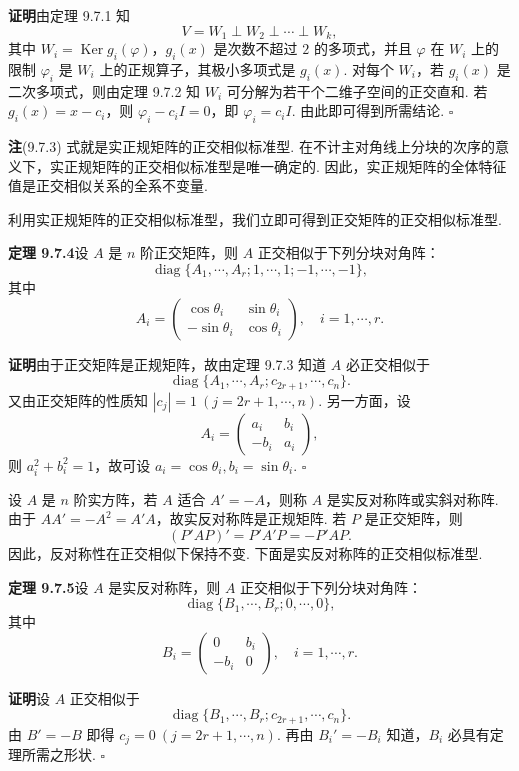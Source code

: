 \documentclass[UTF8,12pt,a4paper,fontset=fandol]{ctexart}
\begin{document}
\noindent\textbf{证明}\quad 由定理 9.7.1 知
\[
  V=W_1\perp W_2\perp\cdots\perp W_k,
\]
其中 $W_i=\operatorname{Ker}g_i(\varphi)$，$g_i(x)$ 是次数不超过 $2$ 的多项式，并且 $\varphi$ 在 $W_i$ 上的限制 $\varphi_i$ 是 $W_i$ 上的正规算子，其极小多项式是 $g_i(x)$. 对每个 $W_i$，若 $g_i(x)$ 是二次多项式，则由定理 9.7.2 知 $W_i$ 可分解为若干个二维子空间的正交直和. 若 $g_i(x)=x-c_i$，则 $\varphi_i-c_iI=0$，即 $\varphi_i=c_iI$. 由此即可得到所需结论. $\square$

\noindent\textbf{注}\quad (9.7.3) 式就是实正规矩阵的正交相似标准型. 在不计主对角线上分块的次序的意义下，实正规矩阵的正交相似标准型是唯一确定的. 因此，实正规矩阵的全体特征值是正交相似关系的全系不变量.

利用实正规矩阵的正交相似标准型，我们立即可得到正交矩阵的正交相似标准型.

\noindent\textbf{定理 9.7.4}\quad 设 $A$ 是 $n$ 阶正交矩阵，则 $A$ 正交相似于下列分块对角阵：
\[
  \operatorname{diag}\{A_1,\cdots,A_r;1,\cdots,1;-1,\cdots,-1\},
\]
其中
\[
  A_i=
  \left(\begin{array}{cc}
    \cos\theta_i & \sin\theta_i\\
    -\sin\theta_i & \cos\theta_i
  \end{array}\right),\quad i=1,\cdots,r.
\]

\noindent\textbf{证明}\quad 由于正交矩阵是正规矩阵，故由定理 9.7.3 知道 $A$ 必正交相似于
\[
  \operatorname{diag}\{A_1,\cdots,A_r;c_{2r+1},\cdots,c_n\}.
\]
又由正交矩阵的性质知 $|c_j|=1\ (j=2r+1,\cdots,n)$. 另一方面，设
\[
  A_i=
  \left(\begin{array}{cc}
    a_i & b_i\\
    -b_i & a_i
  \end{array}\right),
\]
则 $a_i^2+b_i^2=1$，故可设 $a_i=\cos\theta_i,b_i=\sin\theta_i$. $\square$

设 $A$ 是 $n$ 阶实方阵，若 $A$ 适合 $A'=-A$，则称 $A$ 是实反对称阵或实斜对称阵. 由于 $AA'=-A^2=A'A$，故实反对称阵是正规矩阵. 若 $P$ 是正交矩阵，则
\[
  (P'AP)'=P'A'P=-P'AP.
\]
因此，反对称性在正交相似下保持不变. 下面是实反对称阵的正交相似标准型.

\noindent\textbf{定理 9.7.5}\quad 设 $A$ 是实反对称阵，则 $A$ 正交相似于下列分块对角阵：
\[
  \operatorname{diag}\{B_1,\cdots,B_r;0,\cdots,0\},
\]
其中
\[
  B_i=
  \left(\begin{array}{cc}
    0 & b_i\\
    -b_i & 0
  \end{array}\right),\quad i=1,\cdots,r.
\]

\noindent\textbf{证明}\quad 设 $A$ 正交相似于
\[
  \operatorname{diag}\{B_1,\cdots,B_r;c_{2r+1},\cdots,c_n\}.
\]
由 $B'=-B$ 即得 $c_j=0\ (j=2r+1,\cdots,n)$. 再由 $B_i'=-B_i$ 知道，$B_i$ 必具有定理所需之形状. $\square$
\end{document}
